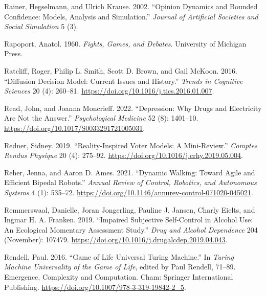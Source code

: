 \documentclass[
  a4paper,
  DIV=11,
  numbers=noendperiod,
  oneside]{scrreprt}
\newlength{\cslhangindent}
\newlength{\cslentryspacingunit} %
\newenvironment{CSLReferences}[2] %
 {%
  \setlength{\parindent}{0pt}
  \ifodd #1
  \let\oldpar\par
  \def\par{\hangindent=\cslhangindent\oldpar}
  \fi
  \setlength{\parskip}{#2\cslentryspacingunit}
 }%
 {}
\begin{document}
\begin{CSLReferences}{1}{0}
\leavevmode{}%
Rainer, Hegselmann, and Ulrich Krause. 2002. {``Opinion {Dynamics} and
{Bounded Confidence}: {Models}, {Analysis} and {Simulation}.''}
\emph{Journal of Artificial Societies and Social Simulation} 5 (3).

\leavevmode{}%
Rapoport, Anatol. 1960. \emph{Fights, {Games}, and {Debates}}.
{University of Michigan Press}.

\leavevmode{}%
Ratcliff, Roger, Philip L. Smith, Scott D. Brown, and Gail McKoon. 2016.
{``Diffusion {Decision Model}: {Current Issues} and {History}.''}
\emph{Trends in Cognitive Sciences} 20 (4): 260--81.
\url{https://doi.org/10.1016/j.tics.2016.01.007}.

\leavevmode{}%
Read, John, and Joanna Moncrieff. 2022. {``Depression: Why Drugs and
Electricity Are Not the Answer.''} \emph{Psychological Medicine} 52 (8):
1401--10. \url{https://doi.org/10.1017/S0033291721005031}.

\leavevmode{}%
Redner, Sidney. 2019. {``Reality-Inspired Voter Models: {A}
Mini-Review.''} \emph{Comptes Rendus Physique} 20 (4): 275--92.
\url{https://doi.org/10.1016/j.crhy.2019.05.004}.

\leavevmode{}%
Reher, Jenna, and Aaron D. Ames. 2021. {``Dynamic {Walking}: {Toward
Agile} and {Efficient Bipedal Robots}.''} \emph{Annual Review of
Control, Robotics, and Autonomous Systems} 4 (1): 535--72.
\url{https://doi.org/10.1146/annurev-control-071020-045021}.

\leavevmode{}%
Remmerswaal, Danielle, Joran Jongerling, Pauline J. Jansen, Charly
Eielts, and Ingmar H. A. Franken. 2019. {``Impaired Subjective
Self-Control in Alcohol Use: {An} Ecological Momentary Assessment
Study.''} \emph{Drug and Alcohol Dependence} 204 (November): 107479.
\url{https://doi.org/10.1016/j.drugalcdep.2019.04.043}.

\leavevmode{}%
Rendell, Paul. 2016. {``Game of {Life Universal Turing Machine}.''} In
\emph{Turing {Machine Universality} of the {Game} of {Life}}, edited by
Paul Rendell, 71--89. Emergence, {Complexity} and {Computation}. {Cham}:
{Springer International Publishing}.
\url{https://doi.org/10.1007/978-3-319-19842-2_5}.


\end{CSLReferences}
\end{document}
